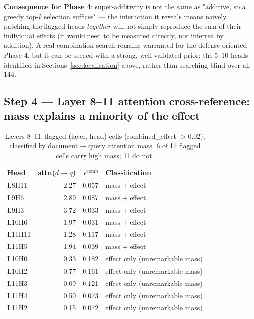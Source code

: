 \documentclass[11pt]{article}
\newcommand{\comb}{\ensuremath{e^{\mathrm{comb}}}}
\begin{document}
\textbf{Consequence for Phase 4}: super-additivity is not the same as "additive, so a
greedy top-$k$ selection suffices" — the interaction it reveals means naively patching the
flagged heads \emph{together} will not simply reproduce the sum of their individual
effects (it would need to be measured directly, not inferred by addition). A real
combination search remains warranted for the defense-oriented Phase 4, but it can be
seeded with a strong, well-validated prior: the 5--10 heads identified in
Sections~\ref{sec:localisation} above, rather than searching blind over all 144.

\subsection{Step 4 — Layer 8--11 attention cross-reference: mass explains a minority of the effect}

\begin{table}[H]
\centering
\caption{Layers 8--11, flagged (layer, head) cells (combined\_effect $>0.02$),
classified by document$\to$query attention mass. 6 of 17 flagged cells carry high mass;
11 do not.}
\label{tab:crossref}
\begin{tabular}{lrrl}
\toprule
Head & attn($d{\to}q$) & $\comb$ & Classification \\
\midrule
L8H11  & 2.27 & 0.057 & mass + effect \\
L9H6   & 2.89 & 0.087 & mass + effect \\
L9H3   & 3.72 & 0.033 & mass + effect \\
L10H6  & 1.97 & 0.031 & mass + effect \\
L11H11 & 1.28 & 0.117 & mass + effect \\
L11H5  & 1.94 & 0.039 & mass + effect \\
\midrule
L10H0  & 0.33 & 0.182 & effect only (unremarkable mass) \\
L10H2  & 0.77 & 0.161 & effect only (unremarkable mass) \\
L11H3  & 0.09 & 0.121 & effect only (unremarkable mass) \\
L11H4  & 0.50 & 0.073 & effect only (unremarkable mass) \\
L11H2  & 0.15 & 0.072 & effect only (unremarkable mass) \\
\bottomrule
\end{tabular}
\end{table}
\end{document}
